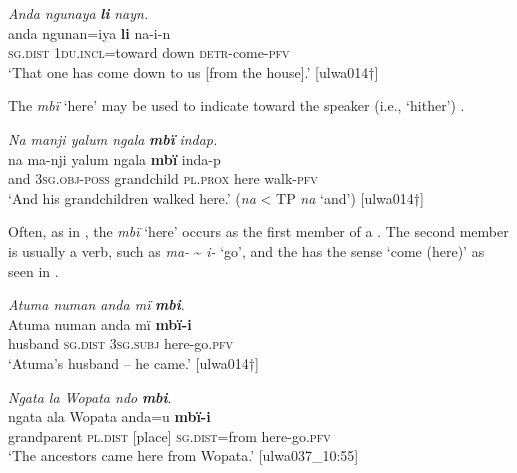 \ea%
    \label{ex:otherwc:81}
          \textit{Anda ngunaya} \textbf{\textit{li}} \textit{nayn.}\\
\gll    anda    ngunan=iya    \textbf{li}    na-i-n\\
    \textsc{sg.dist}  1\textsc{du.incl=}toward  down  \textsc{detr}{}-come-\textsc{pfv}\\
\glt `That one has come down to us [from the house].’ [ulwa014†]
\z

The  \textit{mbï} ‘here’ may be used to indicate  toward the speaker (i.e., ‘hither’) .

\ea%
    \label{ex:otherwc:82}
          \textit{Na manji yalum ngala} \textbf{\textit{mbï}} \textit{indap.}\\
\gll    na    ma-nji      yalum    ngala    \textbf{mbï}  inda-p\\
    and    \textsc{3sg.obj-poss}  grandchild  \textsc{pl.prox}  here  walk-\textsc{pfv}\\
\glt `And his grandchildren walked here.’ (\textit{na} < TP \textit{na} ‘and’) [ulwa014†]
\z




Often, as in , the  \textit{mbï} ‘here’ occurs as the first member of a . The second member is usually a  verb, such as \textit{ma-} {\textasciitilde} \textit{i-} ‘go’, and the  has the sense ‘come (here)’ as seen in .

\ea%
    \label{ex:otherwc:83}
          \textit{Atuma numan anda mï} \textbf{\textit{mbi}}.\\
\gll Atuma  numan    anda    mï      \textbf{mbï-i}\\
    [name]  husband  \textsc{sg.dist}  \textsc{3sg.subj}  here-go.\textsc{pfv}\\
\glt `Atuma’s husband -- he came.’ [ulwa014†]
\z

\ea%
    \label{ex:otherwc:84}
          \textit{Ngata la Wopata ndo} \textbf{\textit{mbi}}.\\
\gll ngata      ala       Wopata  anda=u    \textbf{mbï-i}\\
    grandparent  \textsc{pl.dist}  [place]    \textsc{sg.dist=}from  here-go.\textsc{pfv}\\
\glt `The ancestors came here from Wopata.’ [ulwa037\_10:55]
\z


